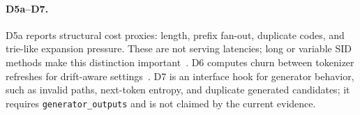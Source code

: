 \paragraph{D5a--D7.}
D5a reports structural cost proxies: \sid length, prefix fan-out, duplicate
codes, and trie-like expansion pressure. These are not serving latencies; long
or variable SID methods make this distinction important~\cite{xia2026acerec,cheng2026capsid}.
D6 computes churn between tokenizer refreshes for drift-aware settings~\cite{feng2026dact,baikalov2026staleness}.
D7 is an interface hook for generator behavior, such as invalid paths,
next-token entropy, and duplicate generated candidates; it requires
\texttt{generator\_outputs} and is not claimed by the current evidence.
